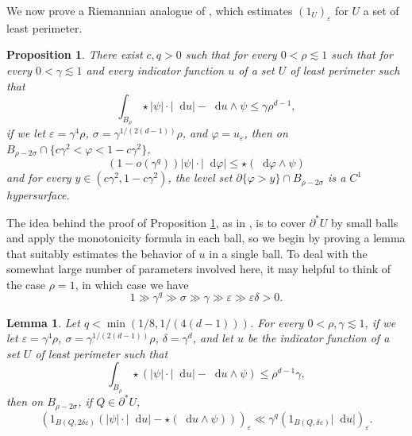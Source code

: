 \documentclass[reqno,10pt]{amsart}
\newcommand*\dif{\mathop{}\!\mathrm{d}}
\newtheorem{lemma}[theorem]{Lemma}
\newtheorem{proposition}[theorem]{Proposition}
\theoremstyle{definition}
\numberwithin{equation}{section}
\begin{document}
We now prove a Riemannian analogue of \cite[Theorem 7.3]{Giusti77}, which estimates $(1_U)_\varepsilon$ for $U$ a set of least perimeter.

\begin{proposition}\label{main mollifier lemma}
There exist $c, q > 0$ such that for every $0 < \rho \lesssim 1$ such that for every $0 < \gamma \lesssim 1$ and every indicator function $u$ of a set $U$ of least perimeter such that
\begin{equation}\label{hypothesis on main mollifier lemma}
\int_{B_\rho} \star |\psi| \cdot |\dif u| - \dif u \wedge \psi \leq \gamma \rho^{d - 1},
\end{equation}
if we let $\varepsilon = \gamma^4\rho$, $\sigma = \gamma^{1/(2(d - 1))}\rho$, and $\varphi = u_\varepsilon$, then on $B_{\rho - 2\sigma} \cap \{c\gamma^2 < \varphi < 1 - c\gamma^2\}$,
\begin{equation}\label{claim on main mollifier lemma}
(1 - o(\gamma^q)) |\psi| \cdot |\dif \varphi| \leq \star(\dif \varphi \wedge \psi)
\end{equation}
and for every $y \in (c\gamma^2, 1 - c\gamma^2)$, the level set $\partial \{\varphi > y\} \cap B_{\rho - 2\sigma}$ is a $C^1$ hypersurface.
\end{proposition}

The idea behind the proof of Proposition \ref{main mollifier lemma}, as in \cite{Giusti77}, is to cover $\partial^* U$ by small balls and apply the monotonicity formula in each ball, so we begin by proving a lemma that suitably estimates the behavior of $u$ in a single ball.
To deal with the somewhat large number of parameters involved here, it may helpful to think of the case $\rho = 1$, in which case we have
$$1 \gg \gamma^q \gg \sigma \gg \gamma \gg \varepsilon \gg \varepsilon \delta > 0.$$

\begin{lemma}\label{mollifier sublemma}
Let $q < \min(1/8, 1/(4(d - 1)))$.
For every $0 < \rho, \gamma \lesssim 1$, if we let $\varepsilon = \gamma^4 \rho$, $\sigma = \gamma^{1/(2(d - 1))} \rho$, $\delta = \gamma^d$, and let $u$ be the indicator function of a set $U$ of least perimeter such that
\begin{equation}\label{hypothesis on mollifier sublemma}
\int_{B_\rho} \star(|\psi| \cdot |\dif u| - \dif u \wedge \psi) \leq \rho^{d - 1} \gamma,
\end{equation}
then on $B_{\rho - 2\sigma}$, if $Q \in \partial^* U$,
$$(1_{B(Q, 2\delta\varepsilon)}(|\psi| \cdot |\dif u| - \star(\dif u \wedge \psi)))_\varepsilon \ll \gamma^q (1_{B(Q, \delta\varepsilon)} |\dif u|)_\varepsilon.$$
\end{lemma}
\end{document}
